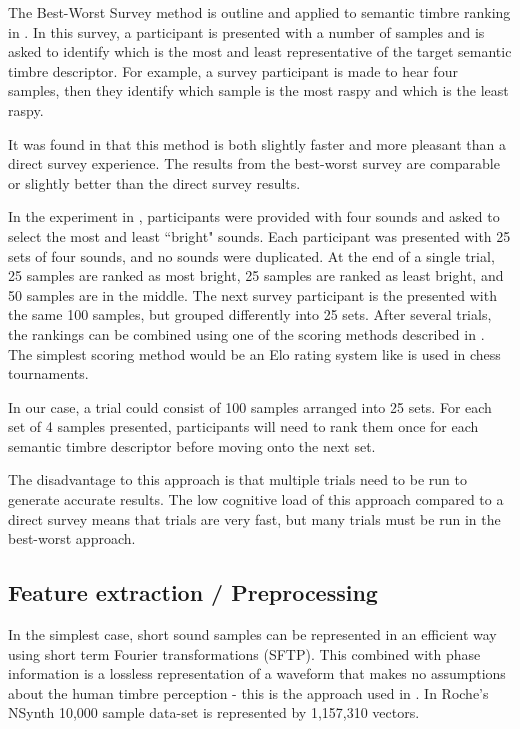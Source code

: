 \documentclass{article}
\begin{document}
The Best-Worst Survey method is outline and applied to semantic timbre ranking in \cite{Victor2022}. In this survey, a participant is presented with a number of samples and is asked to identify which is the most and least representative of the target semantic timbre descriptor. For example, a survey participant is made to hear four samples, then they identify which sample is the most raspy and which is the least raspy.

It was found in \cite{Victor2022} that this method is both slightly faster and more pleasant than a direct survey experience. The results from the best-worst survey are comparable or slightly better than the direct survey results.

In the experiment in \cite{Victor2022}, participants were provided with four sounds and asked to select the most and least ``bright" sounds. Each participant was presented with 25 sets of four sounds, and no sounds were duplicated. At the end of a single trial, 25 samples are ranked as most bright, 25 samples are ranked as least bright, and 50 samples are in the middle. The next survey participant is the presented with the same 100 samples, but grouped differently into 25 sets. After several trials, the rankings can be combined using one of the scoring methods described in \cite{Hollis2018}. The simplest scoring method would be an Elo rating system like is used in chess tournaments.

In our case, a trial could consist of 100 samples arranged into 25 sets. For each set of 4 samples presented, participants will need to rank them once for each semantic timbre descriptor before moving onto the next set.

The disadvantage to this approach is that multiple trials need to be run to generate accurate results. The low cognitive load of this approach compared to a direct survey means that trials are very fast, but many trials must be run in the best-worst approach.


\subsection{Feature extraction / Preprocessing}

In the simplest case, short sound samples can be represented in an efficient way using short term Fourier transformations (SFTP). This combined with phase information is a lossless representation of a waveform that makes no assumptions about the human timbre perception - this is the approach used in \cite{Roche2020}. In Roche's NSynth 10,000 sample data-set is represented by 1,157,310 vectors.
\end{document}
